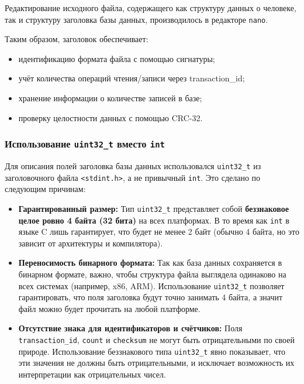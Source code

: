 Редактирование исходного файла, содержащего как структуру данных о человеке, так и структуру заголовка базы данных, производилось в редакторе \texttt{nano}.

Таким образом, заголовок обеспечивает:
\begin{itemize}
  \item идентификацию формата файла с помощью сигнатуры;
  \item учёт количества операций чтения/записи через transaction\_id;
  \item хранение информации о количестве записей в базе;
  \item проверку целостности данных с помощью CRC-32.
\end{itemize}

\subsubsection*{Использование \texttt{uint32\_t} вместо \texttt{int}}

Для описания полей заголовка базы данных использовался \texttt{uint32\_t} из заголовочного файла \texttt{<stdint.h>}, а не привычный \texttt{int}. Это сделано по следующим причинам:

\begin{itemize}
  \item \textbf{Гарантированный размер:} 
  Тип \texttt{uint32\_t} представляет собой \textbf{беззнаковое целое ровно 4 байта (32 бита)} на всех платформах. В то время как \texttt{int} в языке C лишь гарантирует, что будет не менее 2 байт (обычно 4 байта, но это зависит от архитектуры и компилятора).

  \item \textbf{Переносимость бинарного формата:}
  Так как база данных сохраняется в бинарном формате, важно, чтобы структура файла выглядела одинаково на всех системах (например, x86, ARM). Использование \texttt{uint32\_t} позволяет гарантировать, что поля заголовка будут точно занимать 4 байта, а значит файл можно будет прочитать на любой платформе.

  \item \textbf{Отсутствие знака для идентификаторов и счётчиков:}
  Поля \texttt{transaction\_id}, \texttt{count} и \texttt{checksum} не могут быть отрицательными по своей природе. Использование беззнакового типа \texttt{uint32\_t} явно показывает, что эти значения не должны быть отрицательными, и исключает возможность их интерпретации как отрицательных чисел.
\end{itemize}

